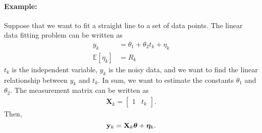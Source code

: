 \paragraph{Example:} Suppose that we want to fit a straight line to a set of data points. The linear data fitting problem can be written as 
\begin{align*}
	y_k &= \theta_1+\theta_2t_k+\eta_k\\
	\mathbb{E}[\eta_k] &= R_k
\end{align*}
$t_k$ is the independent variable, $y_k$ is the noisy data, and we want to find the linear relationship between $y_k$ and $t_k$. In sum, we want to estimate the constants $\theta_1$ and $\theta_2$. The measurement matrix can be written as 
\begin{align*}
	\mathbf{X}_k = \begin{bmatrix}
		1 & t_k
	\end{bmatrix}.
\end{align*}
Then, 
$${\mathbf{y}}_k = \mathbf{X}_k\boldsymbol{\theta}+\boldsymbol{\eta}_k.$$


